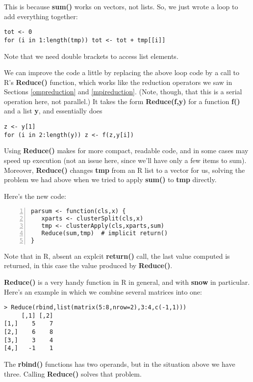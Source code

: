This is because {\bf sum()} works on vectors, not lists.  So, we just
wrote a loop to add everything together:

\begin{lstlisting}
tot <- 0
for (i in 1:length(tmp)) tot <- tot + tmp[[i]]
\end{lstlisting}

Note that we need double brackets to access list elements.

We can improve the code a little by replacing the above loop code by a
call to R's {\bf Reduce()} function, which works like the reduction
operators we saw in Sections \ref{ompreduction} and \ref{mpireduction}.
(Note, though, that this is a serial operation here, not parallel.)
It takes the form {\bf Reduce(f,y)} for a function {\bf f()} and a list
{\bf y}, and essentially does

\begin{lstlisting}
z <- y[1]
for (i in 2:length(y)) z <- f(z,y[i])
\end{lstlisting}

Using {\bf Reduce()} makes for more compact, readable code, and in some
cases may speed up execution (not an issue here, since we'll have only a
few items to sum).  Moreover, {\bf Reduce()} changes {\bf tmp} from an R
list to a vector for us, solving the problem we had above when we tried
to apply {\bf sum()} to {\bf tmp} directly.

Here's the new code:

\begin{lstlisting}[numbers=left]
parsum <- function(cls,x) {
   xparts <- clusterSplit(cls,x)
   tmp <- clusterApply(cls,xparts,sum)
   Reduce(sum,tmp)  # implicit return()
}
\end{lstlisting}

Note that in R, absent an explcit {\bf return()} call, the last value
computed is returned, in this case the value produced by {\bf Reduce()}.

{\bf Reduce()} is a very handy function in R in general, and with {\bf
snow} in particular.  Here's an example in which we combine several
matrices into one:

\begin{lstlisting}
> Reduce(rbind,list(matrix(5:8,nrow=2),3:4,c(-1,1)))
     [,1] [,2]
[1,]    5    7
[2,]    6    8
[3,]    3    4
[4,]   -1    1
\end{lstlisting}

The {\bf rbind()} functions has two operands, but in the situation above
we have three.  Calling {\bf Reduce()} solves that problem.

